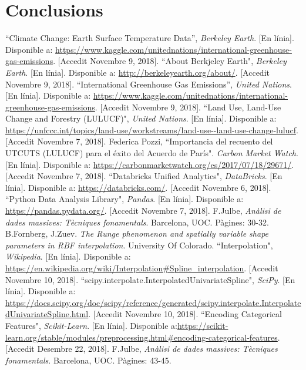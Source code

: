 \documentclass[10pt,a4paper,twocolumn,twoside]{article}
\begin{document}
\section {Conclusions}
\begin{thebibliography}{11}
``Climate Change: Earth Surface Temperature Data”, \textit{Berkeley Earth}. [En línia]. Disponible a: \url{ https://www.kaggle.com/unitednations/international-greenhouse-gas-emissions}. [Accedit Novembre 9, 2018].
``About Berkjeley Earth", \textit{Berkeley Earth}. [En línia]. Disponible a: \url{http://berkeleyearth.org/about/}. [Accedit Novembre 9, 2018].
 ``International Greenhouse Gas Emissions”, \textit{United Nations}. [En línia]. Disponible a: \url{ https://www.kaggle.com/unitednations/international-greenhouse-gas-emissions}. [Accedit Novembre 9, 2018].
 ``Land Use, Land-Use Change and Forestry (LULUCF)", \textit{United Nations}. [En línia]. Disponible a: \url{ https://unfccc.int/topics/land-use/workstreams/land-use--land-use-change-lulucf}. [Accedit Novembre 7, 2018].
Federica Pozzi, ``Importancia del recuento del UTCUTS (LULUCF) para el éxito del Acuerdo de París". \textit{Carbon Market Watch}. [En línia]. Disponible a: \url{https://carbonmarketwatch.org/es/2017/07/18/29671/}. [Accedit Novembre 7, 2018].
``Databricks Unified Analytics", \textit{DataBricks}. [En línia]. Disponible a: \url{https://databricks.com/}. [Accedit Novembre 6, 2018].
 ``Python Data Analysis Library", \textit{Pandas}. [En línia]. Disponible a: \url{https://pandas.pydata.org/}. [Accedit Novembre 7, 2018].
F.Julbe, \textit{Anàlisi de dades massives: Tècniques fonamentals}. Barcelona, UOC. Pàgines: 30-32.
B.Fornberg, J.Zuev. \textit{The Runge phenomenon and spatially variable shape parameters in RBF interpolation}. University Of Colorado.
 ``Interpolation", \textit{Wikipedia}. [En línia]. Disponible a: \url{https://en.wikipedia.org/wiki/Interpolation#Spline_interpolation}. [Accedit Novembre 10, 2018].
 ``scipy.interpolate.InterpolatedUnivariateSpline", \textit{SciPy}. [En línia]. Disponible a: \url{https://docs.scipy.org/doc/scipy/reference/generated/scipy.interpolate.InterpolatedUnivariateSpline.html}. [Accedit Novembre 10, 2018].
``Encoding Categorical Features", \textit{Scikit-Learn}. [En línia]. Disponible a:\url{https://scikit-learn.org/stable/modules/preprocessing.html#encoding-categorical-features}. [Accedit Desembre 22, 2018].
F.Julbe, \textit{Anàlisi de dades massives: Tècniques fonamentals}. Barcelona, UOC. Pàgines: 43-45.

\end{thebibliography}
\end{document}
